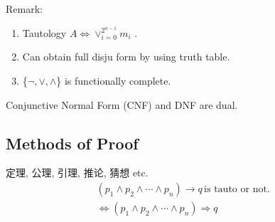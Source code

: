 Remark: 
\begin{enumerate}
    \item Tautology $A \Longleftrightarrow \lor_{i=0}^{2^{n-1}}m_i$ .
    \item Can obtain full disju form by using truth table. 
    \item \{$\neg, \lor,\land$\} is functionally complete.
\end{enumerate}

Conjunctive Normal Form (CNF) and DNF are dual.

\subsection{Methods of Proof}

定理, 公理, 引理, 推论, 猜想 etc.
\begin{align*}
    (p_1\land p_2 \land \cdots \land p_n)\longrightarrow q \,\text{is tauto or not. }\\
    \Longleftrightarrow (p_1\land p_2 \land \cdots \land p_n)\Longrightarrow q
\end{align*}

